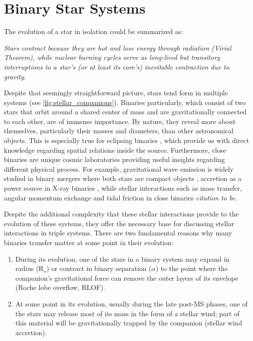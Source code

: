 \section{Binary Star Systems}\label{sec:binary_evolution}

The evolution of a star in isolation could be summarized as:

{\it Stars contract because they are hot and lose energy through radiation (Virial Theorem), while nuclear burning cycles serve as long-lived but transitory interruptions to a star's (or at least its core's) inevitable contraction due to gravity}. 

Despite that seemingly straightforward picture, stars tend form in multiple systems (see \cref{fig:stellar_companions}). Binaries particularly, which consist of two stars that orbit around a shared center of mass and are gravitationally connected to each other, are of immense importance. By nature, they reveal more about themselves, particularly their masses and diameters, than other astronomical objects. This is especially true for eclipsing binaries \citep{prvsa2016physics}, which provide us with direct knowledge regarding spatial relations inside the source. Furthermore, close binaries are unique cosmic laboratories providing useful insights regarding different physical process. For example, gravitational wave emission is widely studied in binary mergers where both stars are compact objects \citep{cutler1994gravitational,abbott2017gw170608,abbott2019gwtc}, accretion as a power source in X-ray binaries \citep{lewin1997x,reig2011x}, while stellar interactions such as mass transfer, angular momentum exchange and tidal friction in close binaries {\it citation to be}. 

Despite the additional complexity that these stellar interactions provide to the evolution of these systems, they offer the necessary base for discussing stellar interactions in triple systems.  There are two fundamental reasons why many binaries transfer matter at some point in their evolution:

\begin{enumerate}
    \item During its evolution, one of the stars in a binary system may expand in radius (R$_{\star}$) or contract in binary separation (${\alpha}$) to the point where the companion's gravitational force can remove the outer layers of its envelope (Roche lobe overflow, RLOF).
    \item At some point in its evolution, usually during the late post-MS phases, one of the stars may release most of its mass in the form of a stellar wind; part of this material will be gravitationally trapped by the companion (stellar wind accretion). 
\end{enumerate}

